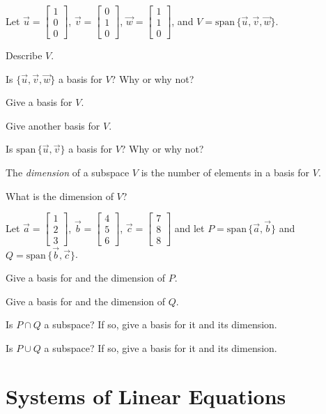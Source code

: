 \documentclass{problemset}
\renewcommand{\span}{\mathrm{span}\,}
\newcommand{\Span}{\mathrm{span}\,}
\newcommand{\mat}[1]{\begin{bmatrix}#1\end{bmatrix}}
\begin{document}
	\question
	Let $\vec u=\mat{1\\0\\0}$, $\vec v=\mat{0\\1\\0}$, $\vec w=\mat{1\\1\\0}$, and $V=\span\{\vec u,\vec v,\vec w\}$.
	\begin{parts}
		\item Describe $V$.
		\item Is $\{\vec u,\vec v,\vec w\}$ a basis for $V$?  Why or why not?
		\item Give a basis for $V$.
		\item Give another basis for $V$.
		\item Is $\Span\{\vec u,\vec v\}$ a basis for $V$?  Why or why not?
	\end{parts}

	\begin{definition}[Dimension]
		The \emph{dimension} of a subspace $V$ is the number of elements in a basis for $V$.
	\end{definition}

	\begin{parts}[resume]
		\item What is the dimension of $V$?
	\end{parts}


	\question
	Let $\vec a=\mat{1\\2\\3}$, $\vec b=\mat{4\\5\\6}$, $\vec c=\mat{7\\8\\8}$ and 
	let $P=\span\{\vec a,\vec b\}$ and $Q=\span\{\vec b,\vec c\}$.
	\begin{parts}
		\item Give a basis for and the dimension of $P$.
		\item Give a basis for and the dimension of $Q$.
		\item Is $P\cap Q$ a subspace? If so, give a basis for it and its dimension.
		\item Is $P\cup Q$ a subspace? If so, give a basis for it and its dimension.
	\end{parts}

	\newpage


\section*{Systems of Linear Equations}
	
\end{document}
